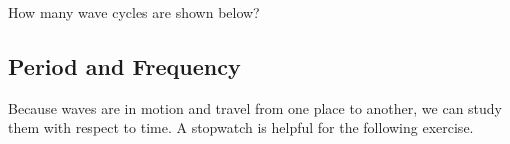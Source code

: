 \documentclass{article}
\numberwithin{equation}{section}
\numberwithin{figure}{section}
\begin{document}
\begin{exercise}
    How many wave cycles are shown below?

\begin{center}
\end{center}
\end{exercise}

\cyanhrule

\subsection{Period and Frequency} \label{BcrbfW}
Because waves are in motion and travel from one place to another, we can study them with respect to time. A stopwatch is helpful for the following exercise. 
\end{document}
